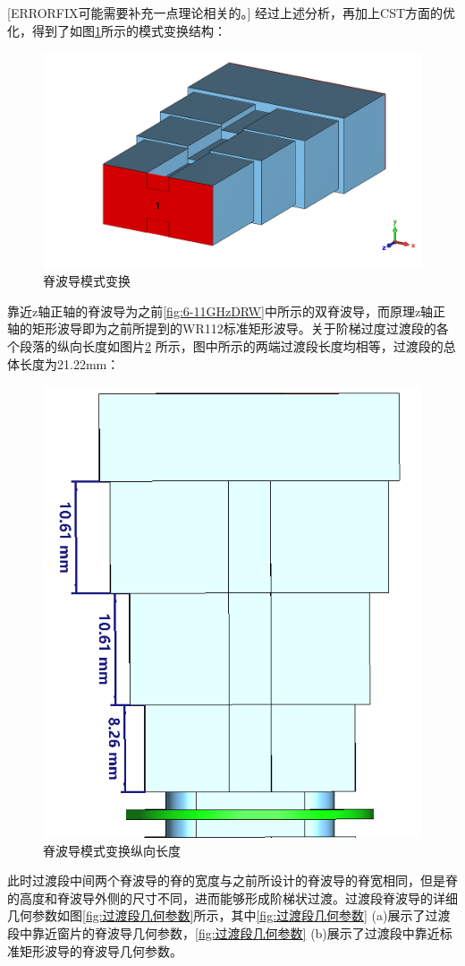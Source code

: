 \documentclass[master]{thesis-uestc}
\begin{document}
[ERRORFIX可能需要补充一点理论相关的。]
经过上述分析，再加上CST方面的优化，得到了如图\ref{fig:脊波导模式变换}所示的模式变换结构：
\begin{figure}[!htb]
    \centering
    \includegraphics[width=0.5\linewidth]{pic/chapter3/脊波导模式变换.png}
    \caption{脊波导模式变换}
    \label{fig:脊波导模式变换}
\end{figure}
靠近z轴正轴的脊波导为之前\ref{fig:6-11GHzDRW}中所示的双脊波导，而原理z轴正轴的矩形波导即为之前所提到的WR112标准矩形波导。关于阶梯过度过渡段的各个段落的纵向长度如图片\ref{fig:脊波导模式变换纵向长度} 所示，图中所示的两端过渡段长度均相等，过渡段的总体长度为21.22mm：

\begin{figure}[!htb]
    \centering
    \includegraphics[width=0.5\linewidth]{pic/chapter3/模式变换纵向长度.png}
    \caption{脊波导模式变换纵向长度}
    \label{fig:脊波导模式变换纵向长度}
\end{figure}
此时过渡段中间两个脊波导的脊的宽度与之前所设计的脊波导的脊宽相同，但是脊的高度和脊波导外侧的尺寸不同，进而能够形成阶梯状过渡。过渡段脊波导的详细几何参数如图\ref{fig:过渡段几何参数}所示，其中\ref{fig:过渡段几何参数} (a)展示了过渡段中靠近窗片的脊波导几何参数，\ref{fig:过渡段几何参数} (b)展示了过渡段中靠近标准矩形波导的脊波导几何参数。
\end{document}
